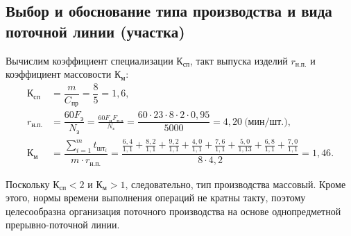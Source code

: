 \subsection[%
Выбор и обоснование типа производства и вида поточной линии \\
(участка)
]{%
  Выбор и обоснование типа производства и
  вида поточной линии (участка)
}

Вычислим коэффициент специализации \( \text{К}_{\text{сп}} \), 
такт выпуска изделий \( r_{\text{н.п.}}\) и
коэффициент массовости \( \text{К}_\text{м} \):
\begin{align*}
\text{К}_{\text{сп}} &= \dfrac{m}{C_{\text{пр}}} = \dfrac{8}{5} = 1{,}6, \\
r_{\text{н.п.}} &= \dfrac{60 F_{\text{э}}}{N_{\text{з}}} = 
  \frac{60 F_{\text{н}} F_{\text{п.о}}}{N_{\text{з}}} =
  \dfrac{60 \cdot 23 \cdot 8 \cdot 2 \cdot 0{,}95}{5000} =
  4{,}20 \: \text{(мин/шт.)}, \\
\text{К}_{\text{м}} &=
\dfrac{\sum^m_{i=1} t_{\text{шт}_{i}}}{m \cdot r_{\text{н.п.}}} = 
\dfrac{
  \frac{6{,}4}{1{,}1} + \frac{8{,}2}{1{,}1} + \frac{9{,}2}{1{,}1} + 
  \frac{4{,}0}{1{,}1} + \frac{7{,}6}{1{,}1} + \frac{5{,}0}{1{,}13} +
  \frac{6{,}8}{1{,}1} + \frac{7{,}0}{1{,}1}
}{
  8 \cdot 4{,}2
} = 1{,}46.
\end{align*}

Поскольку \( \text{К}_{\text{сп}} < 2 \) и \( \text{К}_{\text{м}} > 1 \),
следовательно, тип производства массовый.
Кроме этого, нормы времени выполнения операций не кратны такту, 
поэтому целесообразна организация поточного производства на основе
однопредметной прерывно-поточной линии.